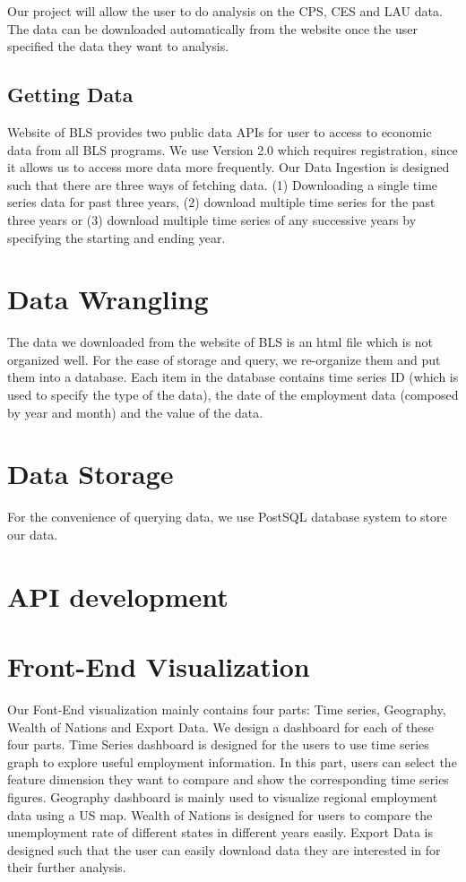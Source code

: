 \documentclass{sigchi}
\begin{document}
Our project will allow the user to do analysis on the CPS, CES and LAU data. The data can be downloaded automatically from the website once the user specified the data they want to analysis.

\subsection{Getting Data}
Website of BLS\cite{Labor_data} provides two public data APIs \cite{API} for user to access to economic data from all BLS programs. We use Version 2.0 which requires registration, since it allows us to access more data more frequently. Our Data Ingestion is designed such that there are three ways of fetching data. (1) Downloading a single time series data for past three years, (2) download multiple time series for the past three years or (3) download multiple time series of any successive years by specifying the starting and ending year.

\section{Data Wrangling}
The data we downloaded from the website of BLS is an html file which is not organized well. For the ease of storage and query, we re-organize them and put them into a database. Each item in the database contains time series ID (which is used to specify the type of the data), the date of the employment data (composed by year and month) and the value of the data.

\section{Data Storage}
For the convenience of querying data, we use PostSQL database system to store our data.

\section{API development}


\section{Front-End Visualization}
Our Font-End visualization mainly contains four parts: Time series, Geography, Wealth of Nations and Export Data. We design a dashboard for each of these four parts. Time Series dashboard is designed for the users to use time series graph to explore useful employment information. In this part, users can select the feature dimension they want to compare and show the corresponding time series figures. Geography dashboard is mainly used to visualize regional employment data using a US map.  Wealth of Nations is designed for users to compare the unemployment rate of different states in different years easily. Export Data is designed such that the user can easily download data they are interested in for their further analysis.
\end{document}
